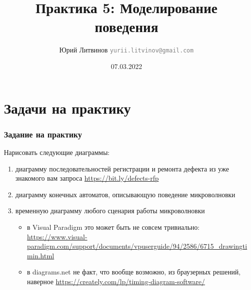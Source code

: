 \documentclass[xetex,mathserif,serif]{beamer}
\title{Практика 5: Моделирование поведения}
\author[Юрий Литвинов]{Юрий Литвинов \newline \textcolor{gray}{\small\texttt{yurii.litvinov@gmail.com}}}
\date{07.03.2022}
\begin{document}
    \frame{\titlepage}

    \section{Задачи на практику}

    \begin{frame}
        \frametitle{Задание на практику}
        Нарисовать следующие диаграммы:
        \begin{enumerate}
            \item диаграмму последовательностей регистрации и ремонта дефекта из уже знакомого вам запроса \url{https://bit.ly/defects-rfp}
            \item диаграмму конечных автоматов, описывающую поведение микроволновки
            \item временную диаграмму любого сценария работы микроволновки
            \begin{itemize}
                \item в Visual Paradigm это может быть не совсем тривиально: \url{https://www.visual-paradigm.com/support/documents/vpuserguide/94/2586/6715_drawingtimin.html}
                \item в diagrams.net не факт, что вообще возможно, из браузерных решений, наверное \url{https://creately.com/lp/timing-diagram-software/}
            \end{itemize}
        \end{enumerate}
    \end{frame}
\end{document}

